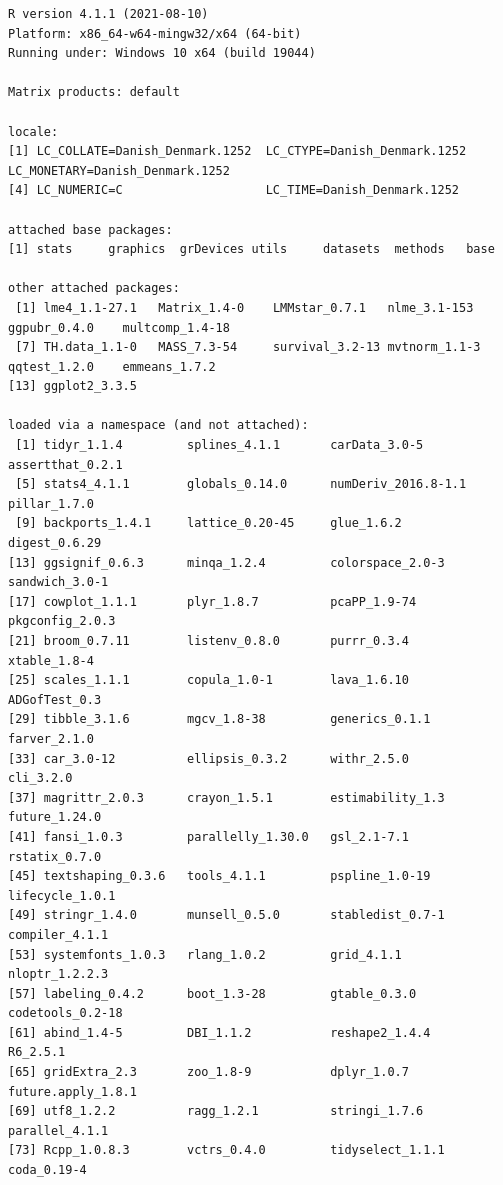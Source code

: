 \documentclass[12pt]{article}
\begin{document}
\begin{verbatim}
R version 4.1.1 (2021-08-10)
Platform: x86_64-w64-mingw32/x64 (64-bit)
Running under: Windows 10 x64 (build 19044)

Matrix products: default

locale:
[1] LC_COLLATE=Danish_Denmark.1252  LC_CTYPE=Danish_Denmark.1252    LC_MONETARY=Danish_Denmark.1252
[4] LC_NUMERIC=C                    LC_TIME=Danish_Denmark.1252    

attached base packages:
[1] stats     graphics  grDevices utils     datasets  methods   base     

other attached packages:
 [1] lme4_1.1-27.1   Matrix_1.4-0    LMMstar_0.7.1   nlme_3.1-153    ggpubr_0.4.0    multcomp_1.4-18
 [7] TH.data_1.1-0   MASS_7.3-54     survival_3.2-13 mvtnorm_1.1-3   qqtest_1.2.0    emmeans_1.7.2  
[13] ggplot2_3.3.5  

loaded via a namespace (and not attached):
 [1] tidyr_1.1.4         splines_4.1.1       carData_3.0-5       assertthat_0.2.1   
 [5] stats4_4.1.1        globals_0.14.0      numDeriv_2016.8-1.1 pillar_1.7.0       
 [9] backports_1.4.1     lattice_0.20-45     glue_1.6.2          digest_0.6.29      
[13] ggsignif_0.6.3      minqa_1.2.4         colorspace_2.0-3    sandwich_3.0-1     
[17] cowplot_1.1.1       plyr_1.8.7          pcaPP_1.9-74        pkgconfig_2.0.3    
[21] broom_0.7.11        listenv_0.8.0       purrr_0.3.4         xtable_1.8-4       
[25] scales_1.1.1        copula_1.0-1        lava_1.6.10         ADGofTest_0.3      
[29] tibble_3.1.6        mgcv_1.8-38         generics_0.1.1      farver_2.1.0       
[33] car_3.0-12          ellipsis_0.3.2      withr_2.5.0         cli_3.2.0          
[37] magrittr_2.0.3      crayon_1.5.1        estimability_1.3    future_1.24.0      
[41] fansi_1.0.3         parallelly_1.30.0   gsl_2.1-7.1         rstatix_0.7.0      
[45] textshaping_0.3.6   tools_4.1.1         pspline_1.0-19      lifecycle_1.0.1    
[49] stringr_1.4.0       munsell_0.5.0       stabledist_0.7-1    compiler_4.1.1     
[53] systemfonts_1.0.3   rlang_1.0.2         grid_4.1.1          nloptr_1.2.2.3     
[57] labeling_0.4.2      boot_1.3-28         gtable_0.3.0        codetools_0.2-18   
[61] abind_1.4-5         DBI_1.1.2           reshape2_1.4.4      R6_2.5.1           
[65] gridExtra_2.3       zoo_1.8-9           dplyr_1.0.7         future.apply_1.8.1 
[69] utf8_1.2.2          ragg_1.2.1          stringi_1.7.6       parallel_4.1.1     
[73] Rcpp_1.0.8.3        vctrs_0.4.0         tidyselect_1.1.1    coda_0.19-4
\end{verbatim}
\end{document}

